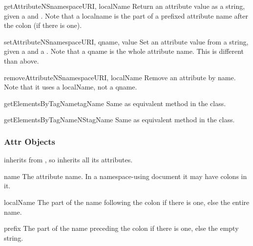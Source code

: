 \begin{methoddesc}[Element]{getAttributeNS}{namespaceURI, localName}
Return an attribute value as a string, given a  and
.  Note that a localname is the part of a prefixed
attribute name after the colon (if there is one).
\end{methoddesc}

\begin{methoddesc}[Element]{setAttributeNS}{namespaceURI, qname, value}
Set an attribute value from a string, given a  and a
.  Note that a qname is the whole attribute name.  This is
different than above.
\end{methoddesc}

\begin{methoddesc}[Element]{removeAttributeNS}{namespaceURI, localName}
Remove an attribute by name.  Note that it uses a localName, not a
qname.
\end{methoddesc}

\begin{methoddesc}[Element]{getElementsByTagName}{tagName}
Same as equivalent method in the  class.
\end{methoddesc}

\begin{methoddesc}[Element]{getElementsByTagNameNS}{tagName}
Same as equivalent method in the  class.
\end{methoddesc}


\subsubsection{Attr Objects \label{dom-attr-objects}}

 inherits from , so inherits all its
attributes.

\begin{memberdesc}[Attr]{name}
The attribute name.  In a namespace-using document it may have colons
in it.
\end{memberdesc}

\begin{memberdesc}[Attr]{localName}
The part of the name following the colon if there is one, else the
entire name.
\end{memberdesc}

\begin{memberdesc}[Attr]{prefix}
The part of the name preceding the colon if there is one, else the
empty string.
\end{memberdesc}

